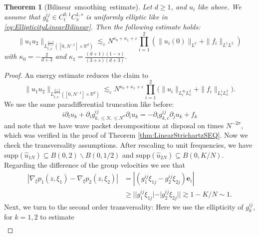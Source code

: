 \documentclass{amsart}
\newtheorem{theorem}{Theorem}[section]
\theoremstyle{definition}
\newcommand{\R}{\mathbb{R}}
\begin{document}
\begin{theorem}[Bilinear~smoothing~estimate]
\label{thm:BilinearSmoothingEstimate}
Let $d \geq 1$, and $u_i$ like above. We assume that $g^{ij}_k \in C^{0,1}_t C^{1,s}_x$ is uniformly elliptic like in \eqref{eq:EllipticityLinearBilinear}. Then the following estimate holds:
\begin{equation*}
\| u_1 u_2 \|_{L^{\frac{d+3}{d+1}}_{t,x}([0,N^{-1}] \times \R^d)} \lesssim_\varepsilon N^{\kappa_0+\kappa_1 +\varepsilon}  \prod_{i=1}^2 ( \| u_i(0) \|_{L^2} + \| f_i \|_{L^1 L^2})
\end{equation*}
with $\kappa_0 = -\frac{2}{d+3}$ and $\kappa_1 = \frac{(d+1)(1-s)}{(3+s)(d+3)}$.
\end{theorem}
\begin{proof}
An energy estimate reduces the claim to
\begin{equation}
    \label{eq:EnergyReductionBilinearStrichartz}
    \| u_1 u_2 \|_{L_{t,x}^{\frac{d+3}{d+3}}([0,N^{-1}] \times \R^d)} \lesssim_\varepsilon N^{\kappa_0 + \kappa_1 + \varepsilon} \prod_{i=1}^2 \big( \| u_i \|_{L_t^{\infty} L_x^2} + \| f_i \|_{L_t^1 L_x^2} \big).
\end{equation}
We use the same paradifferential truncation like before:
\begin{equation*}
i \partial_t u_k + \partial_i g^{ij}_{k, \leq N, \leq N^{\sigma}} \partial_i u_k = - \partial_i g^{ij}_{k, c} \partial_j u_k + f_k
\end{equation*}
and note that we have wave packet decompositions at disposal on times $N^{-2 \sigma}$, which was verified in the proof of Theorem \ref{thm:LinearStrichartzSEQ}. Now we check the transversality assumptions. After rescaling to unit frequencies, we have $\text{supp}(\hat{u}_{1N}) \subseteq B(0,2) \backslash B(0,1/2)$ and $\text{supp}(\hat{u}_{2N}) \subseteq B(0,K/N)$. Regarding the difference of the group velocities we see that
\begin{equation*}
\begin{split}
| \nabla_{\xi} p_1(z,\xi_1) - \nabla_{\xi} p_2(z,\xi_2) | &= |(g^{ij}_1 \xi_{1j} - g^{ij}_2 \xi_{2j}) \mathbf{e}_i | \\
&\geq | |g^{ij}_1 \xi_{1j}| - |g^{ij}_2 \xi_{2j}| | \gtrsim 1- K/N \sim 1.
\end{split}
\end{equation*}
Next, we turn to the second order transversality:
Here we use the ellipticity of $g^{ij}_k$, for $k=1,2$ to estimate
\begin{equation*}
\begin{split}

\end{split}
\end{equation*}
\end{proof}
\end{document}
